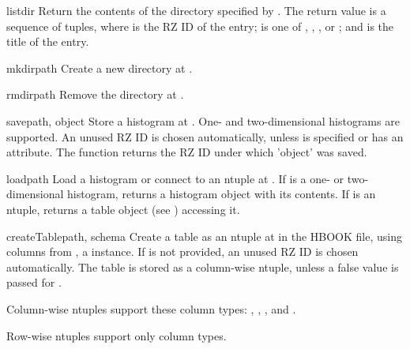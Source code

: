 \begin{methoddesc}{listdir}{}
 Return the contents of the directory specified by .  The
 return value is a sequence of  tuples, where
  is the RZ ID of the entry;  is one of
 , , , or
 ; and  is the title of the entry.
\end{methoddesc}

\begin{methoddesc}{mkdir}{path}
 Create a new directory at .
\end{methoddesc}

\begin{methoddesc}{rmdir}{path}
 Remove the directory at .
\end{methoddesc}

\begin{methoddesc}{save}{path, object}
 Store a histogram  at .  One- and two-dimensional
 histograms are supported.  An unused RZ ID is chosen automatically,
 unless  is specified or  has an 
 attribute.  The function returns the RZ ID under which 'object' was
 saved. 
\end{methoddesc}

\begin{methoddesc}{load}{path}
 Load a histogram or connect to an ntuple at .  If 
 is a one- or two-dimensional histogram, returns a histogram object with
 its contents.  If  is an ntuple, returns a table object (see
 ) accessing it.
\end{methoddesc}

\begin{methoddesc}{createTable}{path, schema}
 Create a table as an ntuple at  in the HBOOK file, using
 columns from , a  instance.  If
  is not provided, an unused RZ ID is chosen automatically.
 The table is stored as a column-wise ntuple, unless a false value is
 passed for .  

 Column-wise ntuples support these column types: ,
 , , and .

 Row-wise ntuples support only  column types.
\end{methoddesc}


